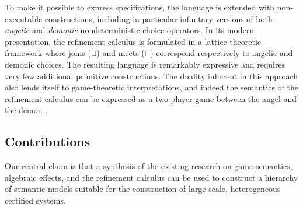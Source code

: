 \documentclass[sigplan,screen]{acmart}
\begin{document}
To make it possible to express specifications,
the language is extended with non-executable constructions,
including in particular infinitary versions of both
\emph{angelic} and \emph{demonic} nondeterministic choice operators.
In its modern presentation,
the refinement calculus is formulated in a lattice-theoretic framework
where joins ($\sqcup$) and meets ($\sqcap$)
correspond respectively to angelic and demonic choices.
The resulting language is remarkably expressive
and requires very few additional primitive constructions.
The duality inherent in this approach
also lends itself to game-theoretic interpretations,
and indeed the semantics of the refinement calculus
can be expressed as a two-player game between
the angel and the demon \cite{refcal}.
%
%
%

\subsection{Contributions} %

Our central claim is that a synthesis
of the existing research on
game semantics, algebraic effects, and the refinement calculus
can be used to construct a hierarchy of semantic models
suitable for the construction of large-scale, heterogeneous certified systems.
\end{document}
